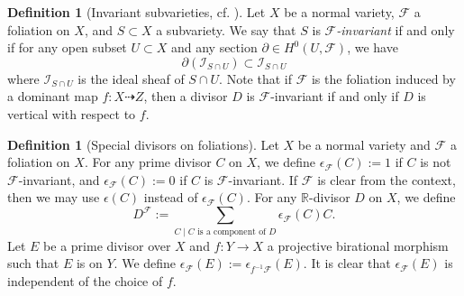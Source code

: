 \documentclass[11pt]{amsart}
\numberwithin{equation}{section}
\newcommand{\Rr}{\mathbb{R}}
\newcommand{\Ff}{\mathcal{F}}
\theoremstyle{definition}
\newtheorem{defn}[thm]{Definition}
\theoremstyle{definition}
\theoremstyle{definition}
\begin{document}
\begin{defn}[Invariant subvarieties, {cf. \cite[3.1]{ACSS21}}]\label{defn: f-invariant}
Let $X$ be a normal variety, $\Ff$ a foliation on $X$, and $S\subset X$ a subvariety. We say that $S$ is \emph{$\Ff$-invariant} if and only if for any open subset $U\subset X$ and any section $\partial\in H^0(U,\Ff)$, we have $$\partial(\mathcal{I}_{S\cap U})\subset \mathcal{I}_{S\cap U}$$ 
where $\mathcal{I}_{S\cap U}$ is the ideal sheaf of $S\cap U$. Note that if $\Ff$ is the foliation induced by a dominant map $f:X\dashrightarrow Z$, then a divisor $D$ is $\Ff$-invariant if and only if $D$ is vertical with respect to $f$.
\end{defn}

\begin{defn}[Special divisors on foliations]\label{defn: special divisors on foliations}
Let $X$ be a normal variety and $\Ff$ a foliation on $X$. For any prime divisor $C$ on $X$, we define $\epsilon_{\Ff}(C):=1$ if $C$ is not $\Ff$-invariant, and  $\epsilon_{\Ff}(C):=0$ if $C$ is $\Ff$-invariant. If $\Ff$ is clear from the context, then we may use $\epsilon(C)$ instead of $\epsilon_{\Ff}(C)$. For any $\Rr$-divisor $D$ on $X$, we define $$D^{\Ff}:=\sum_{C\mid C\text{ is a component of }D}\epsilon_{\Ff}(C)C.$$
Let $E$ be a prime divisor over $X$ and $f: Y\rightarrow X$ a projective birational morphism such that $E$ is on $Y$. We define $\epsilon_{\Ff}(E):=\epsilon_{f^{-1}\Ff}(E)$. It is clear that $\epsilon_{\Ff}(E)$ is independent of the choice of $f$.
\end{defn}
\end{document}

